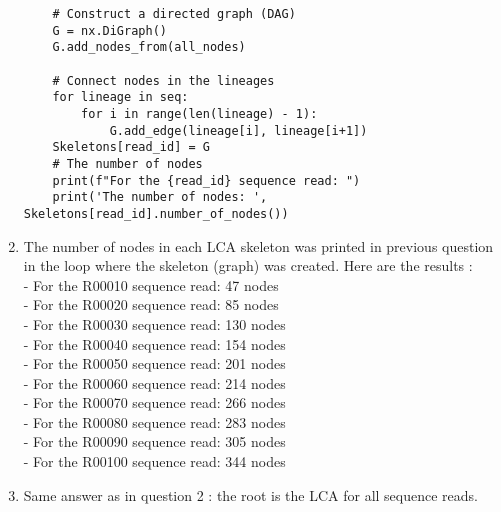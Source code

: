 \documentclass[12 pt,a4paper]{article}
\begin{document}
\begin{enumerate}
\begin{verbatim}
    # Construct a directed graph (DAG)
    G = nx.DiGraph()
    G.add_nodes_from(all_nodes)

    # Connect nodes in the lineages
    for lineage in seq:
        for i in range(len(lineage) - 1):
            G.add_edge(lineage[i], lineage[i+1])
    Skeletons[read_id] = G
    # The number of nodes
    print(f"For the {read_id} sequence read: ")
    print('The number of nodes: ', Skeletons[read_id].number_of_nodes())
\end{verbatim}
\item 
The number of nodes in each LCA skeleton was printed in previous question in the loop where the skeleton (graph) was created. Here are the results : \\
- For the R00010 sequence read: 47 nodes \\
- For the R00020 sequence read: 85 nodes \\
- For the R00030 sequence read: 130 nodes \\
- For the R00040 sequence read: 154 nodes \\
- For the R00050 sequence read: 201 nodes \\
- For the R00060 sequence read: 214 nodes\\
- For the R00070 sequence read: 266 nodes\\
- For the R00080 sequence read: 283 nodes \\
- For the R00090 sequence read: 305 nodes \\
- For the R00100 sequence read: 344 nodes \\

\item Same answer as in question 2 : the root is the LCA for all sequence reads. 
\end {enumerate}
\end{document}
